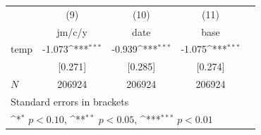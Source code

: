 \documentclass[11pt]{article}
\begin{document}
\begin{subappendices}
\begin{center}
			
				{
					\def\sym#1{\ifmmode^{#1}\else\(^{#1}\)\fi}
					\begin{tabular}{l*{4}{c}}
						\hline\hline
						& \multicolumn{1}{c}{(9)}&\multicolumn{1}{c}{(10)}&\multicolumn{1}{c}{(11)}\\
						& \multicolumn{1}{c}{jm/c/y}&\multicolumn{1}{c}{date}&\multicolumn{1}{c}{base}\\
						\hline
						temp  &  -1.073\sym{***}&      -0.939\sym{***}&      -1.075\sym{***}\\
 						&     [0.271]         &     [0.285]         &     [0.274]         \\
						\hline
						\(N\)      &      206924         &      206924         &      206924         \\
						\hline\hline
						\multicolumn{4}{l}{\footnotesize Standard errors in brackets}\\
						\multicolumn{4}{l}{\footnotesize \sym{*} \(p<0.10\), \sym{**} \(p<0.05\), \sym{***} \(p<0.01\)}\\
					\end{tabular}
				}			
			
		\end{center}
		

\end{subappendices}
\end{document}
